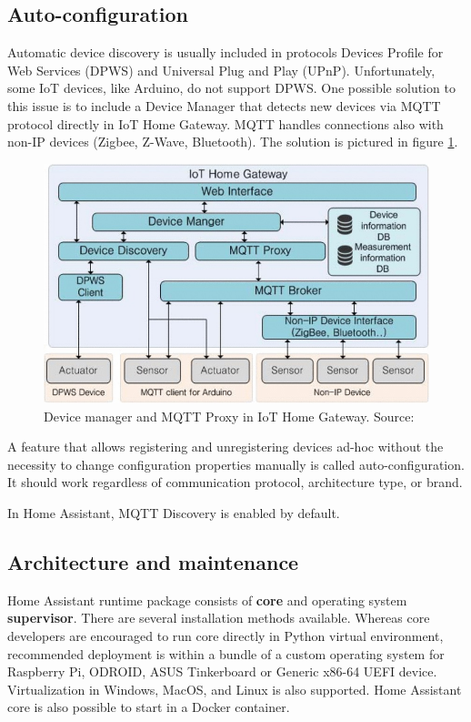\documentclass[fleqn,10pt]{olplainarticle}
\begin{document}
\subsection{Auto-configuration}

Automatic device discovery is usually included in protocols Devices Profile for Web Services (DPWS) and Universal Plug and Play (UPnP). Unfortunately, some IoT devices, like Arduino, do not support DPWS. One possible solution to this issue is to include a Device Manager that detects new devices via MQTT protocol directly in IoT Home Gateway. MQTT handles connections also with non-IP devices (Zigbee, Z-Wave, Bluetooth). The solution is pictured in figure \ref{fig:figure3}.

\begin{figure}[ht]
    \centering
    \includegraphics[width=1\linewidth]{images/device manager.jpg}
    \caption{Device manager and MQTT Proxy in IoT Home Gateway. Source: \cite{Kim2015}}
    \label{fig:figure3}
\end{figure}

A feature that allows registering and unregistering devices ad-hoc without the necessity to change configuration properties manually is called auto-configuration. It should work regardless of communication protocol, architecture type, or brand.

\vskip10pt

In Home Assistant, MQTT Discovery is enabled by default.

\subsection{Architecture and maintenance}

Home Assistant runtime package consists of \textbf{core} and operating system \textbf{supervisor}. There are several installation methods available. Whereas core developers are encouraged to run core directly in Python virtual environment, recommended deployment is within a bundle of a custom operating system for Raspberry Pi, ODROID, ASUS Tinkerboard or Generic x86-64 UEFI device. Virtualization in Windows, MacOS, and Linux is also supported. Home Assistant core is also possible to start in a Docker container.
\end{document}
